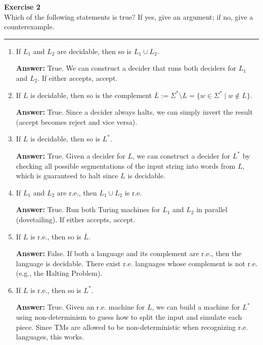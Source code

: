 \documentclass{article}
\theoremstyle{theorem}
\theoremstyle{definition}
\theoremstyle{remark}
\begin{document}
\textbf{Exercise 2}\\
Which of the following statements is true? If yes, give an argument; if no, give a counterexample.
\vspace{0.5em}
\hrule
\vspace{0.5em}
\begin{enumerate}
    \item If \( L_1 \) and \( L_2 \) are decidable, then so is \( L_1 \cup L_2 \).
    
    \textbf{Answer:} True. We can construct a decider that runs both deciders for \( L_1 \) and \( L_2 \). If either accepts, accept.

    \item If \( L \) is decidable, then so is the complement \( \overline{L} := \Sigma^* \setminus L = \{ w \in \Sigma^* \mid w \notin L \} \).
    
    \textbf{Answer:} True. Since a decider always halts, we can simply invert the result (accept becomes reject and vice versa).

    \item If \( L \) is decidable, then so is \( L^* \).
    
    \textbf{Answer:} True. Given a decider for \( L \), we can construct a decider for \( L^* \) by checking all possible segmentations of the input string into words from \( L \), which is guaranteed to halt since \( L \) is decidable.

    \item If \( L_1 \) and \( L_2 \) are r.e., then \( L_1 \cup L_2 \) is r.e.
    
    \textbf{Answer:} True. Run both Turing machines for \( L_1 \) and \( L_2 \) in parallel (dovetailing). If either accepts, accept.

    \item If \( L \) is r.e., then so is \( \overline{L} \).
    
    \textbf{Answer:} False. If both a language and its complement are r.e., then the language is decidable. There exist r.e. languages whose complement is not r.e. (e.g., the Halting Problem).

    \item If \( L \) is r.e., then so is \( L^* \).
    
    \textbf{Answer:} True. Given an r.e. machine for \( L \), we can build a machine for \( L^* \) using non-determinism to guess how to split the input and simulate each piece. Since TMs are allowed to be non-deterministic when recognizing r.e. languages, this works.
\end{enumerate}
\end{document}
